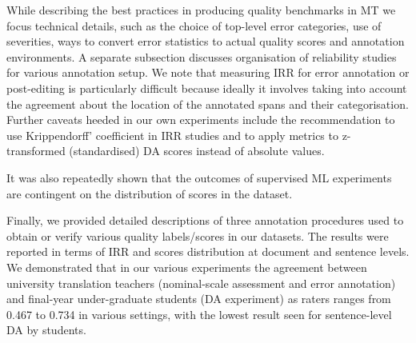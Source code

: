 While describing the best practices in producing quality benchmarks in MT we focus technical details, such as the choice of top-level error categories, use of severities, ways to convert error statistics to actual quality scores and annotation environments. 
A separate subsection discusses organisation of reliability studies for various annotation setup. We note that measuring IRR for error annotation or post-editing is particularly difficult because ideally it involves taking into account the agreement about the location of the annotated spans and their categorisation. Further caveats heeded in our own experiments include the recommendation to use Krippendorff' coefficient in IRR studies and to apply metrics to z-transformed (standardised) DA scores instead of absolute values. 
 
It was also repeatedly shown that the outcomes of supervised ML experiments are contingent on the distribution of scores in the dataset. 

Finally, we provided detailed descriptions of three annotation procedures used to obtain or verify various quality labels/scores in our datasets. The results were reported in terms of IRR and scores distribution at document and sentence levels. We demonstrated that in our various experiments the agreement between university translation teachers (nominal-scale assessment and error annotation) and final-year under-graduate students (DA experiment) as raters ranges from 0.467 to 0.734 in various settings, with the lowest result seen for sentence-level DA by students.
